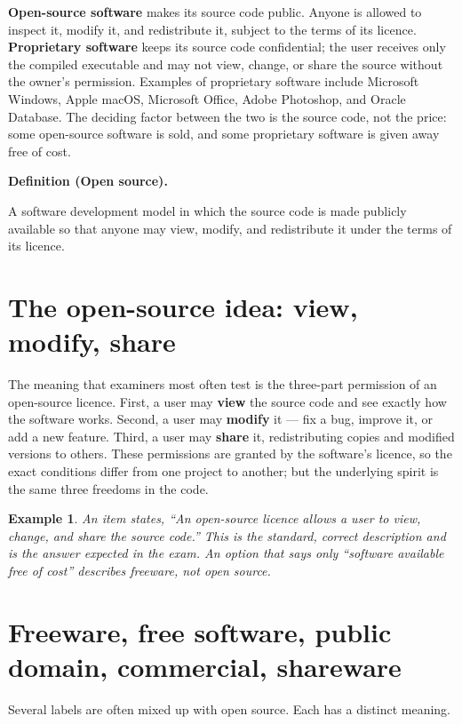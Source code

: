 \documentclass[11pt]{article}
\newtheorem{example}{Example}[section]
\newenvironment{definitionbox}[1]{%
  \par\noindent\textbf{Definition (#1).}\ \itshape
}{\par\vspace{0.3em}}
\begin{document}
\textbf{Open-source software} makes its source code public. Anyone is allowed
to inspect it, modify it, and redistribute it, subject to the terms of its
licence. \textbf{Proprietary software} keeps its source code confidential; the
user receives only the compiled executable and may not view, change, or share
the source without the owner's permission. Examples of proprietary software
include Microsoft Windows, Apple macOS, Microsoft Office, Adobe Photoshop, and
Oracle Database. The deciding factor between the two is the source code, not
the price: some open-source software is sold, and some proprietary software is
given away free of cost.

\begin{definitionbox}{Open source}
A software development model in which the source code is made publicly
available so that anyone may view, modify, and redistribute it under the
terms of its licence.
\end{definitionbox}

\section{The open-source idea: view, modify, share}
The meaning that examiners most often test is the three-part permission of an
open-source licence. First, a user may \textbf{view} the source code and see
exactly how the software works. Second, a user may \textbf{modify} it --- fix a
bug, improve it, or add a new feature. Third, a user may \textbf{share} it,
redistributing copies and modified versions to others. These permissions are
granted by the software's licence, so the exact conditions differ from one
project to another; but the underlying spirit is the same three freedoms in
the code.

\begin{example}
An item states, ``An open-source licence allows a user to view, change, and
share the source code.'' This is the standard, correct description and is the
answer expected in the exam. An option that says only ``software available
free of cost'' describes \emph{freeware}, not open source.
\end{example}

\section{Freeware, free software, public domain, commercial, shareware}
Several labels are often mixed up with open source. Each has a distinct
meaning.
\end{document}
